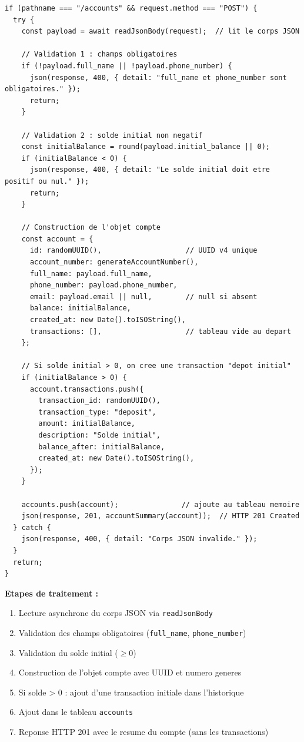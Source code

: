 \documentclass[12pt,a4paper]{article}
\begin{document}
\begin{lstlisting}[style=js, caption={server.js --- POST /accounts}]
if (pathname === "/accounts" && request.method === "POST") {
  try {
    const payload = await readJsonBody(request);  // lit le corps JSON

    // Validation 1 : champs obligatoires
    if (!payload.full_name || !payload.phone_number) {
      json(response, 400, { detail: "full_name et phone_number sont obligatoires." });
      return;
    }

    // Validation 2 : solde initial non negatif
    const initialBalance = round(payload.initial_balance || 0);
    if (initialBalance < 0) {
      json(response, 400, { detail: "Le solde initial doit etre positif ou nul." });
      return;
    }

    // Construction de l'objet compte
    const account = {
      id: randomUUID(),                    // UUID v4 unique
      account_number: generateAccountNumber(),
      full_name: payload.full_name,
      phone_number: payload.phone_number,
      email: payload.email || null,        // null si absent
      balance: initialBalance,
      created_at: new Date().toISOString(),
      transactions: [],                    // tableau vide au depart
    };

    // Si solde initial > 0, on cree une transaction "depot initial"
    if (initialBalance > 0) {
      account.transactions.push({
        transaction_id: randomUUID(),
        transaction_type: "deposit",
        amount: initialBalance,
        description: "Solde initial",
        balance_after: initialBalance,
        created_at: new Date().toISOString(),
      });
    }

    accounts.push(account);               // ajoute au tableau memoire
    json(response, 201, accountSummary(account));  // HTTP 201 Created
  } catch {
    json(response, 400, { detail: "Corps JSON invalide." });
  }
  return;
}
\end{lstlisting}

\textbf{Etapes de traitement :}
\begin{enumerate}[noitemsep]
  \item Lecture asynchrone du corps JSON via \texttt{readJsonBody}
  \item Validation des champs obligatoires (\texttt{full\_name}, \texttt{phone\_number})
  \item Validation du solde initial ($\geq 0$)
  \item Construction de l'objet compte avec UUID et numero generes
  \item Si solde > 0 : ajout d'une transaction initiale dans l'historique
  \item Ajout dans le tableau \texttt{accounts}
  \item Reponse HTTP 201 avec le resume du compte (sans les transactions)
\end{enumerate}
\end{document}
